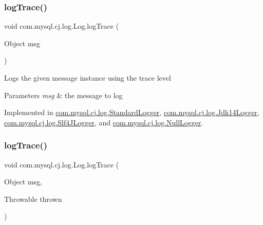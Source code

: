 \mbox{\label{interfacecom_1_1mysql_1_1cj_1_1log_1_1_log_a04f51d4b9464df28c94695ae8159440e}} 
\subsubsection{\texorpdfstring{log\+Trace()}{logTrace()}\hspace{0.1cm}{\footnotesize\ttfamily [1/2]}}
{\footnotesize\ttfamily void com.\+mysql.\+cj.\+log.\+Log.\+log\+Trace (\begin{DoxyParamCaption}\item[{Object}]{msg }\end{DoxyParamCaption})}

Logs the given message instance using the \textquotesingle{}trace\textquotesingle{} level


\begin{DoxyParams}{Parameters}
{\em msg} & the message to log \\
\hline
\end{DoxyParams}


Implemented in \mbox{\hyperlink{classcom_1_1mysql_1_1cj_1_1log_1_1_standard_logger_a31c4a397719a30877e689fcba2e1054a}{com.\+mysql.\+cj.\+log.\+Standard\+Logger}}, \mbox{\hyperlink{classcom_1_1mysql_1_1cj_1_1log_1_1_jdk14_logger_a31e22a245c6b07299ada95de3858d960}{com.\+mysql.\+cj.\+log.\+Jdk14\+Logger}}, \mbox{\hyperlink{classcom_1_1mysql_1_1cj_1_1log_1_1_slf4_j_logger_aa2d6ea6567c9c148b7170d771686386b}{com.\+mysql.\+cj.\+log.\+Slf4\+J\+Logger}}, and \mbox{\hyperlink{classcom_1_1mysql_1_1cj_1_1log_1_1_null_logger_a090baffde957c89a83f1941bcb7cd4d7}{com.\+mysql.\+cj.\+log.\+Null\+Logger}}.

\mbox{\label{interfacecom_1_1mysql_1_1cj_1_1log_1_1_log_aa93fa5550a3152afd64479adca676200}} 
\subsubsection{\texorpdfstring{log\+Trace()}{logTrace()}\hspace{0.1cm}{\footnotesize\ttfamily [2/2]}}
{\footnotesize\ttfamily void com.\+mysql.\+cj.\+log.\+Log.\+log\+Trace (\begin{DoxyParamCaption}\item[{Object}]{msg,  }\item[{Throwable}]{thrown }\end{DoxyParamCaption})}

